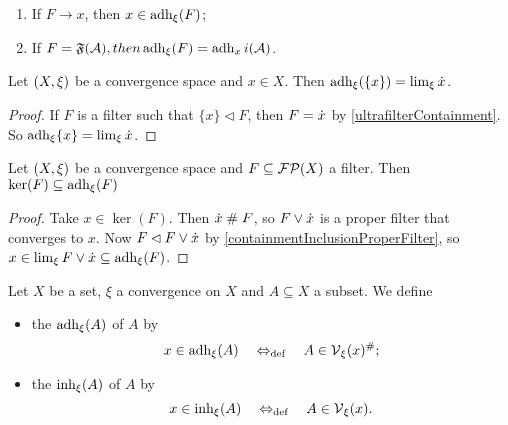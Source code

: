 \begin{lemma}
\begin{enumerate}
\item If $F\to x$, then $x\in \operatorname{adh}_\xi(F)$;
\item If $F = \mathfrak{F}(\mathcal{A}), then \operatorname{adh}_\xi(F) = \operatorname{adh}_xi(\mathcal{A})$.
\end{enumerate}
\end{lemma}

\begin{lemma} \label{singletonAdherence}
Let $\left( X,\xi \right)$ be a convergence space and $x\in X$. Then $\operatorname{adh}_\xi(\{x\}) = \lim_\xi \dot{x}$.
\end{lemma}
\begin{proof}
If $F$ is a filter such that $\{x\} \lhd F$, then $F = \dot{x}$ by \ref{ultrafilterContainment}. So $\operatorname{adh}_\xi \{x\} = \lim_\xi \dot{x}$.
\end{proof}

\begin{proposition}
Let $\left( X,\xi \right)$ be a convergence space and $F\subseteq \operatorname{\mathcal{FP}}(X)$ a filter. Then $\ker(F) \subseteq \operatorname{adh}_\xi(F)$
\end{proposition}
\begin{proof}
Take $x\in \ker(F)$. Then $\dot{x}\mathrel{\#} F$, so $F\vee \dot{x}$ is a proper filter that converges to $x$. Now $F\lhd F\vee \dot{x}$ by \ref{containmentInclusionProperFilter}, so $x\in \lim_\xi F\vee \dot{x} \subseteq \operatorname{adh}_\xi(F)$.
\end{proof}

\begin{definition}
Let $X$ be a set, $\xi$ a convergence on $X$ and $A\subseteq X$ a subset. We define
\begin{itemize}
\item the  $\operatorname{adh}_\xi(A)$ of $A$ by
\[ x\in \operatorname{adh}_\xi(A) \quad\Leftrightarrow_{\text{def}}\quad A\in \operatorname{\mathcal{V}}_\xi(x)^{\mathrel{\#}}; \]
\item the  $\operatorname{inh}_\xi(A)$ of $A$ by
\[ x\in \operatorname{inh}_\xi(A) \quad\Leftrightarrow_{\text{def}}\quad A\in \operatorname{\mathcal{V}}_\xi(x). \]
\end{itemize}
\end{definition}

